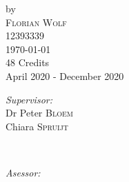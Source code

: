 \documentclass{article}
\begin{document}
\begin{titlepage}
by\\[0.2cm]

\textsc{\Large Florian Wolf}\\[0.2cm] %

{12393339}\\[1cm]










{\Large \today}\\[1cm] %



{48 Credits}\\ %
{April 2020 - December 2020}\\[1cm]






\begin{minipage}[t]{0.4\textwidth}

\begin{flushleft} \large

\emph{Supervisor:} \\

Dr Peter \textsc{Bloem} \\ Chiara \textsc{Spruijt} %

\end{flushleft}

\end{minipage}

~

\begin{minipage}[t]{0.4\textwidth}

\begin{flushright} \large

\emph{Asessor:} \\


\end{flushright}
\end{minipage}
\end{titlepage}
\end{document}
